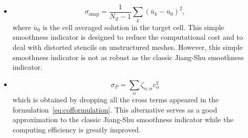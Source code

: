 \documentclass[usenames,dvipsnames,letterpaper,landscape,final]{slides}
\begin{document}
\begin{myslide}

\vspace{20pt}

\begin{itemize}
\item \textit{}%
\begin{equation}\label{eq:simpsmoothnessIC}
\sigma_{\text{simp}} = \frac{1}{N_\mathcal{S} -1 } \sum_k (\overline{u}_k - \overline{u}_0)^2,
\end{equation}
where $\overline{u}_0$ is the cell averaged solution in the target cell.
This simple smoothness indicator is designed to reduce the computational cost and to deal with
distorted stencils on unstructured meshes. However, this simple smoothness indicator is not as robust
as the classic Jiang-Shu smoothness indicator.

\vspace{20pt}

\item \textit{}%
		  \begin{equation}\label{eq:polysigma}
					 \sigma_{P} = \sum_{\alpha} \zeta_{\alpha, \alpha} c_{\alpha}^2
		  \end{equation}
		  which is obtained by dropping all the cross terms appeared in the formulation~\eqref{eq:cofformulation}.
		  This alternative serves as a good approximation to the classic Jiang-Shu smoothness indicator while the 
		  computing efficiency is greatly improved.
\end{itemize}

\end{myslide}
\end{document}
